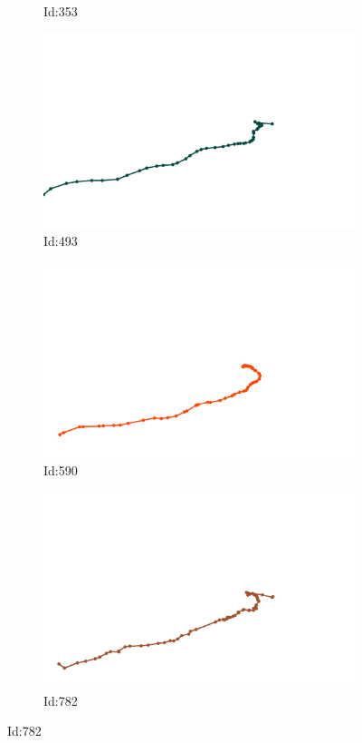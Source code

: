 \documentclass[12pt,twoside]{report}
\begin{document}
\begin{figure}
\begin{subfigure}[b]{0.20\textwidth}
\caption{Id:353}
\end{subfigure}
\begin{subfigure}[b]{0.20\textwidth}
\centering
\includegraphics[width=\textwidth]{../../trajectories/493.png}
\caption{Id:493}
\end{subfigure}
\begin{subfigure}[b]{0.20\textwidth}
\centering
\includegraphics[width=\textwidth]{../../trajectories/590.png}
\caption{Id:590}
\end{subfigure}
\begin{subfigure}[b]{0.20\textwidth}
\centering
\includegraphics[width=\textwidth]{../../trajectories/782.png}
\caption{Id:782}
\end{subfigure}
\end{figure}
\end{document}
